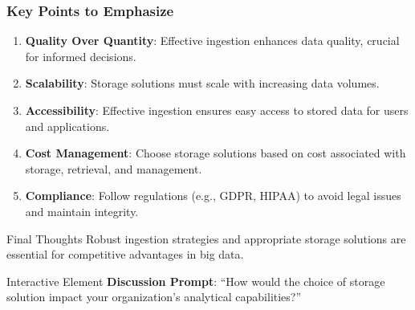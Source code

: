 \documentclass[aspectratio=169]{beamer}
\begin{document}
\begin{frame}[fragile]
  \frametitle{Key Points to Emphasize}
  \begin{enumerate}
      \item \textbf{Quality Over Quantity}: Effective ingestion enhances data quality, crucial for informed decisions.
      \item \textbf{Scalability}: Storage solutions must scale with increasing data volumes.
      \item \textbf{Accessibility}: Effective ingestion ensures easy access to stored data for users and applications.
      \item \textbf{Cost Management}: Choose storage solutions based on cost associated with storage, retrieval, and management.
      \item \textbf{Compliance}: Follow regulations (e.g., GDPR, HIPAA) to avoid legal issues and maintain integrity.
  \end{enumerate}
  
  \begin{block}{Final Thoughts}
      Robust ingestion strategies and appropriate storage solutions are essential for competitive advantages in big data.
  \end{block}
  
  \begin{block}{Interactive Element}
      \textbf{Discussion Prompt}: “How would the choice of storage solution impact your organization's analytical capabilities?”
  \end{block}
\end{frame}
\end{document}
